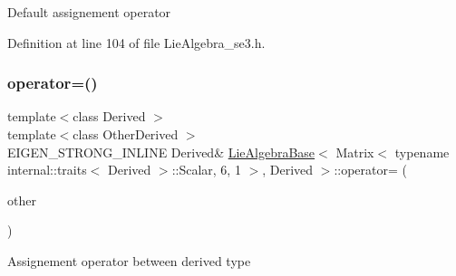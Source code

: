 Default assignement operator 

Definition at line 104 of file Lie\+Algebra\+\_\+se3.\+h.

\hypertarget{class_lie_algebra_base_3_01_matrix_3_01typename_01internal_1_1traits_3_01_derived_01_4_1_1_scala449314c781550590437697c4dc21a6d4_a181050e82398e48f0e7d171cdaa899d6}{}\label{class_lie_algebra_base_3_01_matrix_3_01typename_01internal_1_1traits_3_01_derived_01_4_1_1_scala449314c781550590437697c4dc21a6d4_a181050e82398e48f0e7d171cdaa899d6} 
\subsubsection{\texorpdfstring{operator=()}{operator=()}\hspace{0.1cm}{\footnotesize\ttfamily [2/3]}}
{\footnotesize\ttfamily template$<$class Derived $>$ \\
template$<$class Other\+Derived $>$ \\
E\+I\+G\+E\+N\+\_\+\+S\+T\+R\+O\+N\+G\+\_\+\+I\+N\+L\+I\+NE Derived\& \hyperlink{class_lie_algebra_base}{Lie\+Algebra\+Base}$<$ Matrix$<$ typename internal\+::traits$<$ Derived $>$\+::Scalar, 6, 1 $>$, Derived $>$\+::operator= (\begin{DoxyParamCaption}\item[{const Matrix\+Base$<$ Other\+Derived $>$ \&}]{other }\end{DoxyParamCaption})}

Assignement operator between derived type \hypertarget{class_lie_algebra_base_3_01_matrix_3_01typename_01internal_1_1traits_3_01_derived_01_4_1_1_scala449314c781550590437697c4dc21a6d4_a52f06f5362f72159f491b169de48db27}{}\label{class_lie_algebra_base_3_01_matrix_3_01typename_01internal_1_1traits_3_01_derived_01_4_1_1_scala449314c781550590437697c4dc21a6d4_a52f06f5362f72159f491b169de48db27} 
